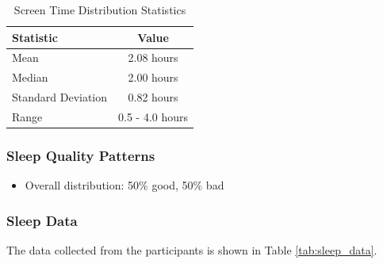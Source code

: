 \documentclass[conference]{IEEEtran}
\begin{document}
\begin{table}[htbp]
\begin{center}
\begin{tabular}{|l|c|}
\hline
\textbf{Statistic} & \textbf{Value} \\
\hline
Mean & 2.08 hours \\
Median & 2.00 hours \\
Standard Deviation & 0.82 hours \\
Range & 0.5 - 4.0 hours \\
\hline
\end{tabular}
\end{center}
\caption{Screen Time Distribution Statistics}
\label{tab:screen_time_distribution}
\end{table}

\subsubsection{Sleep Quality Patterns}
\begin{itemize}
\item Overall distribution: 50\% good, 50\% bad
\end{itemize}

\subsubsection{Sleep Data}
The data collected from the participants is shown in Table \ref{tab:sleep_data}.
\end{document}
